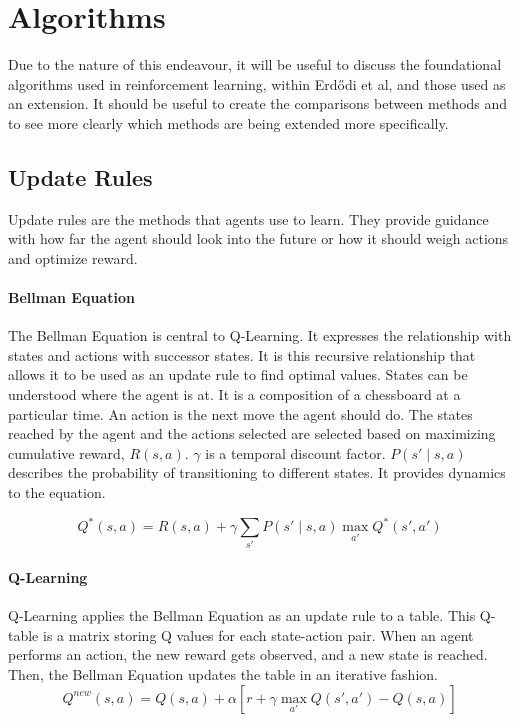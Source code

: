 \documentclass[conference]{IEEEtran}
\begin{document}
\section{Algorithms}
\vspace{-3mm}
Due to the nature of this endeavour, it will be useful to discuss the foundational algorithms used in reinforcement learning, within Erdődi et al, and those used as an extension. It should be useful to create the comparisons between methods and to see more clearly which methods are being extended more specifically. 

\subsection{Update Rules}
Update rules are the methods that agents use to learn. They provide guidance with how far the agent should look into the future or how it should weigh actions and optimize reward. 

\vspace{2mm}
\paragraph{Bellman Equation}
The Bellman Equation is central to Q-Learning. It expresses the relationship with states and actions with successor states. It is this recursive relationship that allows it to be used as an update rule to find optimal values. States can be understood where the agent is at. It is a composition of a chessboard at a particular time. An action is the next move the agent should do. The states reached by the agent and the actions selected are selected based on maximizing cumulative reward, $R(s,a)$. $\gamma$ is a temporal discount factor.  $P(s' \mid s, a)$ describes the probability of transitioning to different states. It provides dynamics to the equation.  

\vspace{-4mm}
\begin{equation}
    Q^*(s, a) = R(s, a) + \gamma \sum_{s'} P(s' \mid s, a) \max_{a'} Q^*(s', a') 
\end{equation}

\vspace{-2mm}
\paragraph{Q-Learning}
Q-Learning applies the Bellman Equation as an update rule to a table. This Q-table is a matrix storing Q values for each state-action pair. When an agent performs an action, the new reward gets observed, and a new state is reached. Then, the Bellman Equation updates the table in an iterative fashion. 
\begin{equation}
    Q^{new}(s, a) = Q(s, a) + \alpha \left[ r + \gamma \max_{a'} Q(s', a') - Q(s, a) \right]
\end{equation}
\end{document}
